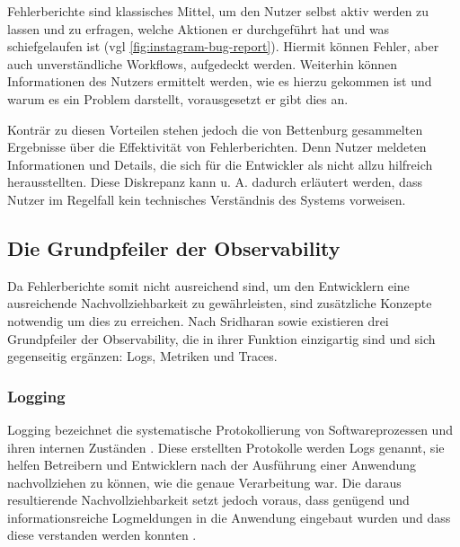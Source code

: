 Fehlerberichte sind klassisches Mittel, um den Nutzer selbst aktiv werden zu lassen und zu erfragen, welche Aktionen er durchgeführt hat und was schiefgelaufen ist (vgl \autoref{fig:instagram-bug-report}). Hiermit können Fehler, aber auch unverständliche Workflows, aufgedeckt werden. Weiterhin können Informationen des Nutzers ermittelt werden, wie es hierzu gekommen ist und warum es ein Problem darstellt, vorausgesetzt er gibt dies an.

Konträr zu diesen Vorteilen stehen jedoch die von Bettenburg \etal \cite{WhatMakesAGoodBugReport} gesammelten Ergebnisse über die Effektivität von Fehlerberichten. Denn Nutzer meldeten Informationen und Details, die sich für die Entwickler als nicht allzu hilfreich herausstellten. Diese Diskrepanz kann u. A. dadurch erläutert werden, dass Nutzer im Regelfall kein technisches Verständnis des Systems vorweisen.

\subsection{Die Grundpfeiler der Observability}

Da Fehlerberichte somit nicht ausreichend sind, um den Entwicklern eine ausreichende Nachvollziehbarkeit zu gewährleisten, sind zusätzliche Konzepte notwendig um dies zu erreichen. Nach Sridharan \etal \cite{DistributedSystemsObservability} sowie \cite{TraefikLogsRequestTracingAndMetrics} \cite{IntrospectiveOfTheCloudManagementToolbox} \cite{MultilevelObservabilityInCloudOrchestration} existieren drei Grundpfeiler der Observability, die in ihrer Funktion einzigartig sind und sich gegenseitig ergänzen: Logs, Metriken und Traces.

\subsubsection{Logging}


Logging bezeichnet die systematische Protokollierung von Softwareprozessen und ihren internen Zuständen \cite{LearningToLog}. Diese erstellten Protokolle werden Logs genannt, sie helfen Betreibern und Entwicklern nach der Ausführung einer Anwendung nachvollziehen zu können, wie die genaue Verarbeitung war. Die daraus resultierende Nachvollziehbarkeit setzt jedoch voraus, dass genügend und informationsreiche Logmeldungen in die Anwendung eingebaut wurden und dass diese verstanden werden konnten \cite{LearningToLog}.

